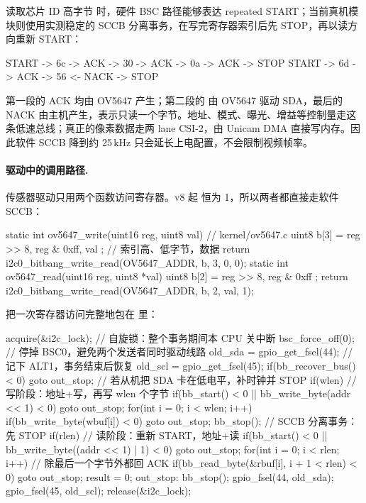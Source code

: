 读取芯片 ID 高字节  时，硬件 BSC 路径能够表达 repeated START；当前真机模块则使用实测稳定的 SCCB 分离事务，在写完寄存器索引后先 STOP，再以读方向重新 START：

\begin{txtcode}
START -> 6c -> ACK -> 30 -> ACK -> 0a -> ACK -> STOP
START -> 6d -> ACK -> 56 <- NACK -> STOP
\end{txtcode}

第一段的 ACK 均由 OV5647 产生；第二段的  由 OV5647 驱动 SDA，最后的 NACK 由主机产生，表示只读一个字节。地址、模式、曝光、增益等控制量走这条低速总线；真正的像素数据走两 lane CSI-2，由 Unicam DMA 直接写内存。因此软件 SCCB 降到约 25\,kHz 只会延长上电配置，不会限制视频帧率。

\paragraph{驱动中的调用路径.} 传感器驱动只用两个函数访问寄存器。v8 起  恒为 1，所以两者都直接走软件 SCCB：

\begin{ccode}
static int ov5647_write(uint16 reg, uint8 val) {           // kernel/ov5647.c
  uint8 b[3] = { reg >> 8, reg & 0xff, val };               // 索引高、低字节，数据
  return i2c0_bitbang_write_read(OV5647_ADDR, b, 3, 0, 0);
}
static int ov5647_read(uint16 reg, uint8 *val) {
  uint8 b[2] = { reg >> 8, reg & 0xff };
  return i2c0_bitbang_write_read(OV5647_ADDR, b, 2, val, 1);
}
\end{ccode}

 把一次寄存器访问完整地包在  里：

\begin{ccode}
acquire(&i2c_lock);                     // 自旋锁：整个事务期间本 CPU 关中断
bsc_force_off(0);                       // 停掉 BSC0，避免两个发送者同时驱动线路
old_sda = gpio_get_fsel(44);            // 记下 ALT1，事务结束后恢复
old_scl = gpio_get_fsel(45);
if(bb_recover_bus() < 0) goto out_stop; // 若从机把 SDA 卡在低电平，补时钟并 STOP
if(wlen){                               // 写阶段：地址+写，再写 wlen 个字节
  if(bb_start() < 0 || bb_write_byte(addr << 1) < 0) goto out_stop;
  for(int i = 0; i < wlen; i++)
    if(bb_write_byte(wbuf[i]) < 0) goto out_stop;
  bb_stop();                            // SCCB 分离事务：先 STOP
}
if(rlen){                               // 读阶段：重新 START，地址+读
  if(bb_start() < 0 || bb_write_byte((addr << 1) | 1) < 0) goto out_stop;
  for(int i = 0; i < rlen; i++)         // 除最后一个字节外都回 ACK
    if(bb_read_byte(&rbuf[i], i + 1 < rlen) < 0) goto out_stop;
}
result = 0;
out_stop:
bb_stop();
gpio_fsel(44, old_sda); gpio_fsel(45, old_scl);
release(&i2c_lock);
\end{ccode}


